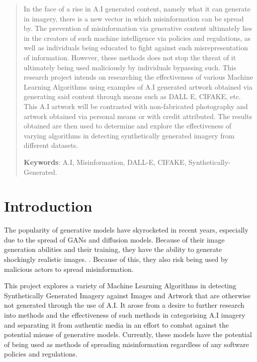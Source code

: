 \documentclass[12pt,letter]{article}
\begin{document}
\begin{abstract}
In the face of a rise in A.I generated content, namely what it can generate in imagery, there is a new vector in which misinformation can be spread by. The prevention of misinformation via generative content ultimately lies in the creators of such machine intelligence via policies and regulations, as well as individuals being educated to fight against such misrepresentation of information. However, these methods does not stop the threat of it ultimately being used maliciously by individuals bypassing such. This research project intends on researching the effectiveness of various Machine Learning Algorithms using examples of A.I generated artwork obtained via generating said content through means such as DALL E, CIFAKE, etc. This A.I artwork will be contrasted with non-fabricated photography and artwork obtained via personal means or with credit attributed. The results obtained are then used to determine and explore the effectiveness of varying algorithms in detecting synthetically generated imagery from different datasets.

\textbf{Keywords}: A.I, Misinformation, DALL-E, CIFAKE, Synthetically-Generated.
\end{abstract}

\section{Introduction}

The popularity of generative models have skyrocketed in recent years, especially due to the spread of GANs and diffusion models.\cite{amorosor2023} \cite{chenj2024} Because of their image generation abilities and their training, they have the ability to generate shockingly realistic images. \cite{amorosor2023} \cite{chenj2024}. Because of this, they also risk being used by malicious actors to spread misinformation.\cite{brundagem2018}

This project explores a variety of Machine Learning Algorithms in detecting Synthetically Generated Imagery against Images and Artwork that are otherwise not generated through the use of A.I. It arose from a desire to further research into methods and the effectiveness of such methods in categorising A.I imagery and separating it from authentic media in an effort to combat against the potential misuse of generative models. Currently, these models have the potential of being used as methods of spreading misinformation regardless of any software policies and regulations.\cite{amorosor2023}
\end{document}
